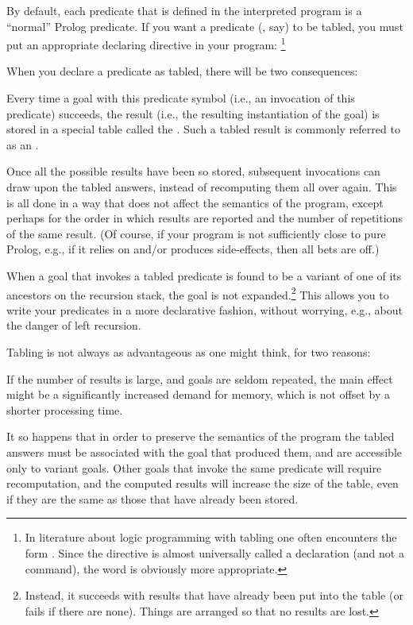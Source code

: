 By default, each predicate that is defined in the interpreted program is a
``normal'' Prolog predicate.  If you want a predicate (, say) to be
tabled, you must put an appropriate declaring directive in your
program:%
\footnote{
    In literature about logic programming with tabling one often
    encounters the form .  Since the directive is
    almost universally called a declaration (and not a command), the word
     is obviously more appropriate.}\\
\ind{}\label{dir:tabled}

When you declare a predicate as tabled, there will be
two consequences:
\begin{Enumerate}
\item
  Every time a goal with this predicate symbol (i.e., an invocation of this
  predicate) succeeds, the result (i.e., the resulting instantiation of the
  goal) is stored in a special table called the .  Such a tabled result is commonly
  referred to as an .

  Once all the possible results have been so stored, subsequent invocations
  can draw upon the tabled answers, instead of recomputing them all over
  again. This is all done in a way that does not affect the semantics of the
  program, except perhaps for the order in which results are reported and the
  number of repetitions of the same result. (Of course, if your program is
  not sufficiently close to pure Prolog, e.g., if it relies on and/or
  produces side-effects, then all bets are off.)

\item
  When a goal that invokes a tabled predicate is found to be a variant of one
  of its ancestors on the recursion stack, the goal is not
  expanded.\footnote{
    Instead, it succeeds with results that have already been put into the
    table (or fails if there are none).  Things are arranged so that no
    results are lost.}
  This allows you to write your predicates in a more declarative fashion,
  without worrying, e.g., about the danger of left recursion.
\end{Enumerate}


Tabling is not always as advantageous as one might think, for two reasons:
  \begin{Enumerate}
  \item
    If the number of results is large, and goals are seldom repeated, the
    main effect might be a significantly increased demand for memory, which
    is not offset by a shorter processing time.

  \item It so happens that in order to preserve the semantics of the program
    the tabled answers must be associated with the goal that produced them,
    and are accessible only to variant goals.  Other goals that invoke the
    same predicate will require recomputation, and the computed results will
    increase the size of the table, even if they are the same as those that
    have already been stored.
  \end{Enumerate}


